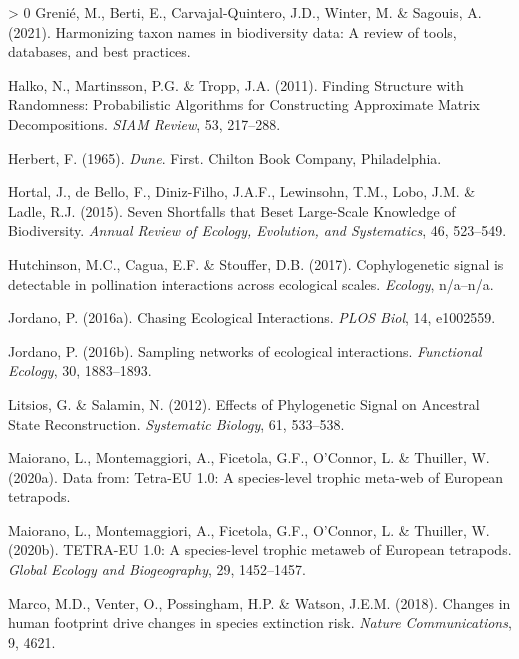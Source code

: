 \documentclass[11pt]{article}
\newlength{\cslhangindent}
\newenvironment{CSLReferences}[3] %
 {%
  \setlength{\parindent}{0pt}
  \ifodd #1 \everypar{\setlength{\hangindent}{\cslhangindent}}\ignorespaces\fi
  \ifnum #2 > 0
  \setlength{\parskip}{#2\baselineskip}
  \fi
 }%
 {}
\begin{document}
\begin{CSLReferences}{1}{0}
\leavevmode\hypertarget{ref-Grenie2021HarTax}{}%
Grenié, M., Berti, E., Carvajal-Quintero, J.D., Winter, M. \& Sagouis,
A. (2021). Harmonizing taxon names in biodiversity data: A review of
tools, databases, and best practices.

\leavevmode\hypertarget{ref-Halko2011FinStr}{}%
Halko, N., Martinsson, P.G. \& Tropp, J.A. (2011). Finding Structure
with Randomness: Probabilistic Algorithms for Constructing Approximate
Matrix Decompositions. \emph{SIAM Review}, 53, 217--288.

\leavevmode\hypertarget{ref-Herbert1965Dun}{}%
Herbert, F. (1965). \emph{Dune}. First. Chilton Book Company,
Philadelphia.

\leavevmode\hypertarget{ref-Hortal2015SevSho}{}%
Hortal, J., de Bello, F., Diniz-Filho, J.A.F., Lewinsohn, T.M., Lobo,
J.M. \& Ladle, R.J. (2015). Seven Shortfalls that Beset Large-Scale
Knowledge of Biodiversity. \emph{Annual Review of Ecology, Evolution,
and Systematics}, 46, 523--549.

\leavevmode\hypertarget{ref-Hutchinson2017CopSig}{}%
Hutchinson, M.C., Cagua, E.F. \& Stouffer, D.B. (2017). Cophylogenetic
signal is detectable in pollination interactions across ecological
scales. \emph{Ecology}, n/a--n/a.

\leavevmode\hypertarget{ref-Jordano2016ChaEco}{}%
Jordano, P. (2016a). Chasing Ecological Interactions. \emph{PLOS Biol},
14, e1002559.

\leavevmode\hypertarget{ref-Jordano2016SamNet}{}%
Jordano, P. (2016b). Sampling networks of ecological interactions.
\emph{Functional Ecology}, 30, 1883--1893.

\leavevmode\hypertarget{ref-Litsios2012EffPhy}{}%
Litsios, G. \& Salamin, N. (2012). Effects of Phylogenetic Signal on
Ancestral State Reconstruction. \emph{Systematic Biology}, 61, 533--538.

\leavevmode\hypertarget{ref-Maiorano2020DatTet}{}%
Maiorano, L., Montemaggiori, A., Ficetola, G.F., O'Connor, L. \&
Thuiller, W. (2020a). Data from: Tetra-EU 1.0: A species-level trophic
meta-web of European tetrapods.

\leavevmode\hypertarget{ref-Maiorano2020TetEu}{}%
Maiorano, L., Montemaggiori, A., Ficetola, G.F., O'Connor, L. \&
Thuiller, W. (2020b). TETRA-EU 1.0: A species-level trophic metaweb of
European tetrapods. \emph{Global Ecology and Biogeography}, 29,
1452--1457.

\leavevmode\hypertarget{ref-Marco2018ChaHum}{}%
Marco, M.D., Venter, O., Possingham, H.P. \& Watson, J.E.M. (2018).
Changes in human footprint drive changes in species extinction risk.
\emph{Nature Communications}, 9, 4621.


\end{CSLReferences}
\end{document}
